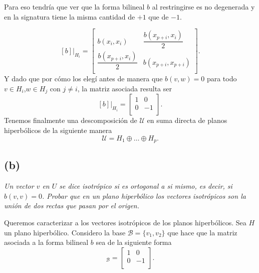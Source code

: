  Para eso tendría que ver que la forma bilineal $b$ al restringirse es no degenerada y en la signatura tiene la misma cantidad de $+1$ que de $-1$. 
 
 \begin{equation*}
 	\left. [b]\right| _ {H_i}	=
 	\begin{bmatrix}
 	b(x_{i}, x_{i}) & \dfrac{b(x_{p+i}, x_{i})}{2}  \\
 	\dfrac{b(x_{p+i}, x_{i})}{2} & b(x_{p+i}, x_{p+i}) \\
 	\end{bmatrix}.
\end{equation*} 
  Y dado que por cómo los elegí antes de manera que $b(v,w)=0$ para todo $v \in H_i$,$w \in H_j$ con $j \neq i$, la matriz asociada resulta ser
  \begin{equation*}
  \left. [b]\right| _ {H_i}	=
  \begin{bmatrix}
  1 & 0  \\
  0 & -1 \\
  \end{bmatrix}.
  \end{equation*}
Tenemos finalmente una descomposición de $\mathcal U$ en suma directa de planos hiperbólicos de la siguiente manera
\begin{equation*}
 \mathcal{U} = H_1 \oplus \dots \oplus H_{p}. 
\end{equation*} 


\subsection*{(b)}

\textit{Un vector $v$ en $U$ se dice isotr\'opico si es ortogonal a si mismo, es decir, si $b(v, v) = 0$.
Probar que en un plano hiperb\'olico los vectores isotr\'opicos son la uni\'on de dos
rectas que pasan por el origen.}

\bigskip

Queremos caracterizar a los vectores isotrópicos de los planos hiperbólicos. Sea $H$ un plano hiperbólico. Considero la base $\mathcal B = \{v_1 , v_2\}$ que hace que la matriz asociada a la forma bilineal $b$ sea de la siguiente forma
 \begin{equation*}
[b]_\mathcal{B}	=
\begin{bmatrix}
1 & 0  \\
0 & -1 \\
\end{bmatrix}.
\end{equation*} 


